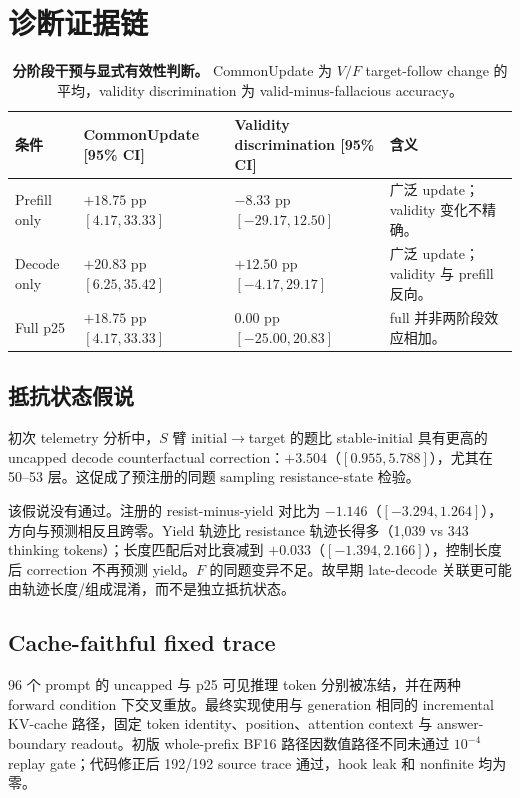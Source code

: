 \documentclass[UTF8,letterpaper,10pt,twocolumn]{ctexart}
\begin{document}
\section{诊断证据链}
\label{supp:diagnostics-zh}

\begin{table}[t]
\centering
\small
\begin{tabular}{lL{4.0cm}L{4.0cm}L{4.0cm}}
\toprule
条件 & CommonUpdate [95\% CI] & Validity discrimination [95\% CI] & 含义 \\
\midrule
Prefill only & $+18.75$ pp $[4.17,33.33]$ & $-8.33$ pp $[-29.17,12.50]$ & 广泛 update；validity 变化不精确。 \\
Decode only & $+20.83$ pp $[6.25,35.42]$ & $+12.50$ pp $[-4.17,29.17]$ & 广泛 update；validity 与 prefill 反向。 \\
Full p25 & $+18.75$ pp $[4.17,33.33]$ & $0.00$ pp $[-25.00,20.83]$ & full 并非两阶段效应相加。 \\
\bottomrule
\end{tabular}
\caption{\textbf{分阶段干预与显式有效性判断。} CommonUpdate 为 $V/F$ target-follow change 的平均，validity discrimination 为 valid-minus-fallacious accuracy。}
\label{tab:supp-phase-zh}
\end{table}

\subsection{抵抗状态假说}

初次 telemetry 分析中，$S$ 臂 initial$\rightarrow$target 的题比 stable-initial 具有更高的 uncapped decode counterfactual correction：$+3.504$（$[0.955,5.788]$），尤其在 50--53 层。这促成了预注册的同题 sampling resistance-state 检验。

该假说没有通过。注册的 resist-minus-yield 对比为 $-1.146$（$[-3.294,1.264]$），方向与预测相反且跨零。Yield 轨迹比 resistance 轨迹长得多（1,039 vs 343 thinking tokens）；长度匹配后对比衰减到 $+0.033$（$[-1.394,2.166]$），控制长度后 correction 不再预测 yield。$F$ 的同题变异不足。故早期 late-decode 关联更可能由轨迹长度/组成混淆，而不是独立抵抗状态。

\subsection{Cache-faithful fixed trace}

96 个 prompt 的 uncapped 与 p25 可见推理 token 分别被冻结，并在两种 forward condition 下交叉重放。最终实现使用与 generation 相同的 incremental KV-cache 路径，固定 token identity、position、attention context 与 answer-boundary readout。初版 whole-prefix BF16 路径因数值路径不同未通过 $10^{-4}$ replay gate；代码修正后 192/192 source trace 通过，hook leak 和 nonfinite 均为零。
\end{document}

